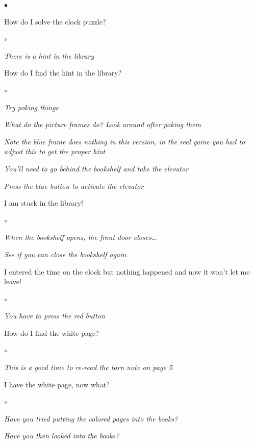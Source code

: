 \documentclass{book}
\newenvironment{list1}%
{\begin{list}{$\bullet$}{\setlength{\parsep}{0.05ex}\setlength{\itemsep}{0mm}}}
{\end{list}\normalsize}
\newenvironment{list2}%
{\begin{list}{$\circ$}{\setlength{\parsep}{0.05ex}\setlength{\itemsep}{0mm}}}
{\end{list}\normalsize}
\begin{document}
\begin{list1}
\pagebreak

	\item How do I solve the clock puzzle?
	\begin{list2}
		\item {\em There is a hint in the library}
	\end{list2}

	\item How do I find the hint in the library?
	\begin{list2}
		\item {\em Try poking things}
		\item {\em What do the picture frames do? Look around after
			poking them}
		\item {\em Note the blue frame does nothing in this version,
			in the real game you had to adjust this to get the
			proper hint}
		\item {\em You'll need to go behind the bookshelf and take the
		elevator}
		\item {\em Press the blue button to activate the elevator}
	\end{list2}

	\item I am stuck in the library!
		\begin{list2}
		\item {\em When the bookshelf opens, the front door closes\dots}
		\item {\em See if you can close the bookshelf again}
		\end{list2}

	\item I entered the time on the clock but nothing happened and now
		it won't let me leave!
		\begin{list2}
		\item {\em You have to press the red button}
		\end{list2}
\pagebreak
	\item How do I find the white page?
		\begin{list2}
		\item {\em This is a good time to re-read the torn note on page 5}
		\end{list2}

	\item I have the white page, now what?
		\begin{list2}
		\item {\em Have you tried putting the colored pages 
			into the books?}
		\item {\em Have you then looked into the books?}
		\end{list2}


\end{list1}
\end{document}
